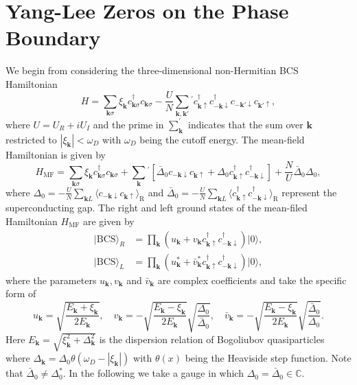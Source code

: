 \documentclass[aps,onecolumn,nofootinbib,superscriptaddress,notitlepage,longbibliography]{revtex4-1}
\begin{document}
\section{Yang-Lee Zeros on the Phase Boundary}
We begin from considering the three-dimensional non-Hermitian BCS Hamiltonian
\begin{equation}
	H=\sum_{\boldsymbol{k}\sigma}\xi_{\boldsymbol{k}}c_{\boldsymbol{k}\sigma}^{\dagger}c_{\boldsymbol{k}\sigma}-\frac{U}{N}\sum_{\bm{k},\bm{k}'}{}^{'}c_{\bm{k}\uparrow}^{\dagger}c_{\bm{-k}\downarrow}^{\dagger}c_{\bm{-k}'\downarrow}c_{\bm{k}'\uparrow}, \label{eq:non-Hermitian}
	\end{equation}
where $U=U_R+iU_I$ and the prime in $\sum_{\bm{k}}^{'}$ indicates that the sum over $\bm{k}$ restricted to  $|\xi_{\boldsymbol{k}}|<\omega_D$ with $\omega_D$ being the cutoff energy. The mean-field Hamiltonian is given by 
\begin{equation}
H_{\mathrm{MF}}=\sum_{\boldsymbol{k}\sigma}\xi_{\boldsymbol{k}}c_{\boldsymbol{k}\sigma}^{\dagger}c_{\boldsymbol{k}\sigma}+\sum_{\bm{k}}{}^{'}[\bar{\Delta}_0c_{-\bm{k}\downarrow}c_{\bm{k}\uparrow}+\Delta_0 c_{\bm{k}\uparrow}^{\dagger}c_{-\bm{k}\downarrow}^{\dagger}]+\frac{N}{U}\bar{\Delta}_{0}\Delta_{0},
\end{equation}
 where $\Delta_{0}=-\frac{U}{N}\sum_{\boldsymbol{k}L}\langle c_{-\boldsymbol{k}\downarrow}c_{\boldsymbol{k}\uparrow}\rangle_{\mathrm{R}}$ and $\bar{\Delta}_0=-\frac{U}{N}\sum_{\boldsymbol{k}L}\langle c^{\dagger}_{\boldsymbol{k}\uparrow}c^{\dagger}_{-\boldsymbol{k}\downarrow}\rangle_{\mathrm{R}}$ represent the superconducting gap. The right and left ground states of the mean-filed Hamiltonian $H_{\mathrm{MF}}$ are given by \cite{Yamamoto2019}
\begin{align}
	|\text{BCS}\rangle_{R}&=\prod_{\bm{k}}(u_{\bm{k}}+v_{\bm{k}}c_{\boldsymbol{k}\uparrow}^{\dagger}c_{-\boldsymbol{k}\downarrow}^{\dagger})|0\rangle,\\
	|\text{BCS}\rangle_{L}&=\prod_{\bm{k}}(u^{*}_{\bm{k}}+\bar{v}^{*}_{\bm{k}}c_{\boldsymbol{k}\uparrow}^{\dagger}c_{-\boldsymbol{k}\downarrow}^{\dagger})|0\rangle,
\end{align}
where the parameters $u_{\bm{k}},v_{\bm{k}}$ and $\bar{v}_{\bm{k}}$ are complex coefficients and take the specific form of
\begin{equation}
	u_{\bm{k}}=\sqrt{\frac{E_{\bm{k}}+\xi_{\bm{k}}}{2E_{\bm{k}}}},\quad v_{\bm{k}}=-\sqrt{\frac{E_{\bm{k}}-\xi_{\bm{k}}}{2E_{\bm{k}}}}\sqrt{\frac{\Delta_0}{\bar{\Delta}_0}},\quad
	\bar{v}_{\bm{k}}=-\sqrt{\frac{E_{\bm{k}}-\xi_{\bm{k}}}{2E_{\bm{k}}}}\sqrt{\frac{\bar{\Delta}_0}{\Delta_0}}.
\end{equation}
Here $E_{\bm{k}}=\sqrt{\xi_{\bm{k}}^2+\Delta_{\bm{k}}^2}$ is the dispersion relation of Bogoliubov quasiparticles where $\Delta_{\bm{k}}=\Delta_0\theta(\omega_D-|\xi_{\bm{k}}|)$ with $\theta(x)$ being the Heaviside step function. Note that $\bar{\Delta}_0\neq\Delta_0^*$. In the following we take a gauge  \cite{Yamamoto2019} in which $\Delta_0=\bar{\Delta}_0\in\mathbb{C}$.
\end{document}
